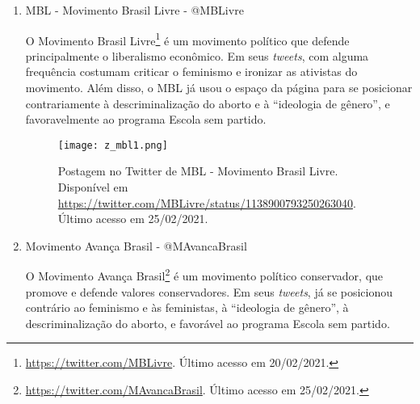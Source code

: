 \documentclass[
	12pt,				%
	openright,			%
	twoside,			%
	a4paper,			%
	english,			%
	brazil				%
	]{abntex2}
\begin{document}
\begin{anexosenv}
\begin{enumerate}
 Compreendido por seus membros como uma comunidade de conservadores, o Movimento Brasil Conservador\footnote{\url{https://twitter.com/EuSouMBC}. Último acesso em 20/02/2021.} (MBC) se propõe a ``trabalhar pela reconstrução do país, pautados na defesa dos pilares da civilização ocidental e no combate à dominação cultural imposta por ideologias revolucionárias''. Dentro dessa comunidade, os membros têm acesso ao que chamam de ``formação intelectual'' e realizam ``desde cursos, grupos de estudos, seminários e congressos até manifestações de rua e nas câmaras e assembleias legislativas''\footnote{Veja mais sobre o movimento em \url{https://www.eusoumbc.org/}. Último acesso em 24/02/2021.}. Através de \textit{tweets}, o MBC se posiciona favorável ao projeto Escola sem partido, contrário à descriminalização do aborto e à ideologia de gênero. Também já publicaram que compreendem o feminismo como uma ``farsa''.
 
 \begin{figure}[!htbp]
    \centering
    \texttt{[image: z\_mbc\_1.png]}
    \caption{Postagem no Twitter de MBC – Movimento Brasil Conservador. Disponível em \url{https://twitter.com/EuSouMBC/status/1149712044339240960}. Último acesso em 25/02/2021.}
 \end{figure}
 
  \newpage
  
 \item MBL - Movimento Brasil Livre - @MBLivre
 
 O Movimento Brasil Livre\footnote{\url{https://twitter.com/MBLivre}. Último acesso em 20/02/2021.} é um movimento político que defende principalmente o liberalismo econômico. Em seus \textit{tweets}, com alguma frequência costumam criticar o feminismo e ironizar as ativistas do movimento. Além disso, o MBL já usou o espaço da página para se posicionar contrariamente à descriminalização do aborto e à ``ideologia de gênero'', e favoravelmente ao programa Escola sem partido.
 
 \begin{figure}[!htbp]
    \centering
    \texttt{[image: z\_mbl1.png]}
    \caption{Postagem no Twitter de MBL - Movimento Brasil Livre. Disponível em \url{https://twitter.com/MBLivre/status/1138900793250263040}. Último acesso em 25/02/2021.}
 \end{figure}
  
 \item Movimento Avança Brasil  - @MAvancaBrasil\label{mab}
 
 O Movimento Avança Brasil\footnote{\url{https://twitter.com/MAvancaBrasil}. Último acesso em 25/02/2021.} é um movimento político conservador, que promove e defende valores conservadores. Em seus \textit{tweets}, já se posicionou contrário ao feminismo e às feministas, à ``ideologia de gênero'', à descriminalização do aborto, e favorável ao programa Escola sem partido.
 

\end{enumerate}
\end{anexosenv}
\end{document}

